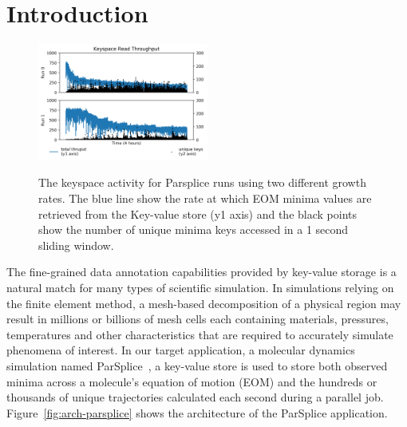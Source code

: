 \section{Introduction}


\begin{figure}[t]
  \noindent\includegraphics[width=0.5\textwidth]{figures/futurework-regimes.png}\\
  \caption{The keyspace activity for Parsplice runs using two different growth 
  rates.  The blue line show the rate at which EOM minima values are retrieved
  from the Key-value store (y1 axis) and the black points show the number of
  unique minima keys accessed in a 1 second sliding window. 
  \label{fig:futurework-regimes}}
\end{figure}

The fine-grained data annotation capabilities provided by key-value storage is
a natural match for many types of scientific simulation. In simulations relying
on the finite element method, a mesh-based decomposition of a physical region
may result in millions or billions of mesh cells each containing materials,
pressures, temperatures and other characteristics that are required to
accurately simulate phenomena of interest. In our target application, a
molecular dynamics simulation named ParSplice~\cite{perez:jctc20150parsplice},
a key-value store is used to store both observed minima across a molecule's
equation of motion (EOM) and the hundreds or thousands of unique trajectories
calculated each second during a parallel job. Figure~\ref{fig:arch-parsplice}
shows the architecture of the ParSplice application.

